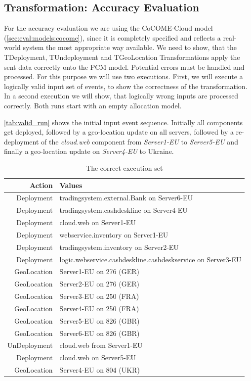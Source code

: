 \subsection{Transformation: Accuracy Evaluation}

For the accuracy evaluation we are using the CoCOME-Cloud model (\autoref{sec:eval:models:cocome}), since it is completely specified and reflects a real-world system the most appropriate way available. We need to show, that the TDeployment, TUndeployment and TGeoLocation Transformations apply the sent data correctly onto the PCM model. Potential errors must be handled and processed. For this purpose we will use two executions. First, we will execute a logically valid input set of events, to show the correctness of the transformation. In a second execution we will show, that logically wrong inputs are processed correctly. Both runs start with an empty allocation model.

\autoref{tab:valid_run} shows the initial input event sequence. Initially all components get deployed, followed by a geo-location update on all servers, followed by a re-deployment of the \textit{cloud.web} component from \textit{Server1-EU} to \textit{Server5-EU} and finally a geo-location update on \textit{Server4-EU} to Ukraine.

\begin{table}[h]
	\centering
	\begin{tabular}{r | l}
		\hline
		\textbf{Action} & \textbf{Values}\\
		\hline
		Deployment & tradingsystem.external.Bank on Server6-EU\\
		Deployment & tradingsystem.cashdeskline on Server4-EU\\
		Deployment & cloud.web on Server1-EU\\
		Deployment & webservice.inventory on Server1-EU\\
		Deployment & tradingsystem.inventory on Server2-EU\\
		Deployment & logic.webservice.cashdeskline.cashdeskservice on Server3-EU\\
		GeoLocation & Server1-EU on 276 (GER)\\
		GeoLocation & Server2-EU on 276 (GER)\\
		GeoLocation & Server3-EU on 250 (FRA)\\
		GeoLocation & Server4-EU on 250 (FRA)\\
		GeoLocation & Server5-EU on 826 (GBR)\\
		GeoLocation & Server6-EU on 826 (GBR)\\
		UnDeployment & cloud.web from Server1-EU\\
		Deployment & cloud.web on Server5-EU\\
		GeoLocation & Server4-EU on 804 (UKR)\\
		\hline
		\end{tabular}
	\caption{The correct execution set}
	\label{tab:valid_run}
\end{table}

